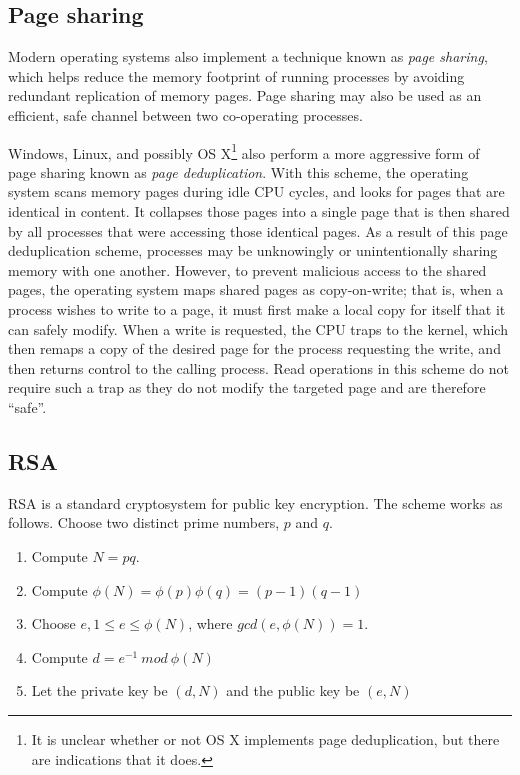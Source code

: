 \documentclass[11pt]{llncs}
\begin{document}
\subsection{Page sharing} %

Modern operating systems also implement a technique known as \textit{page
sharing}, which helps reduce the memory footprint of running processes by
avoiding redundant replication of memory pages. Page sharing may also be used as
an efficient, safe channel between two co-operating processes.

Windows, Linux, and possibly OS X\footnote{It is unclear whether or not OS X
implements page deduplication, but there are indications that it does.} also perform a
more aggressive form of page sharing known as \textit{page deduplication}. With
this scheme, the operating system scans memory pages during idle CPU cycles, and
looks for pages that are identical in content. It collapses those pages into a
single page that is then shared by all processes that were accessing those
identical pages. As a result of this page deduplication scheme, processes may be
unknowingly or unintentionally sharing memory with one another. However, to
prevent malicious access to the shared pages, the operating system maps shared
pages as copy-on-write; that is, when a process wishes to write to a page, it
must first make a local copy for itself that it can safely modify. When a write
is requested, the CPU traps to the kernel, which then remaps a copy of the
desired page for the process requesting the write, and then returns control to
the calling process. Read operations in this scheme do not require such a trap
as they do not modify the targeted page and are therefore ``safe''.

\subsection{RSA}

RSA is a standard cryptosystem for public key encryption. The scheme works as
follows. Choose two distinct prime numbers, $p$ and $q$.

\begin{enumerate}
    \item Compute $N = pq$.
    \item Compute $\phi(N) = \phi(p)\phi(q) = (p-1)(q-1)$
    \item Choose $e, 1 \leq e \leq \phi(N)$, where $gcd(e,\phi(N)) = 1$.
    \item Compute $d = e^{-1}\ mod\ \phi(N)$
    \item Let the private key be $(d,N)$ and the public key be $(e,N)$
\end{enumerate}
\end{document}
